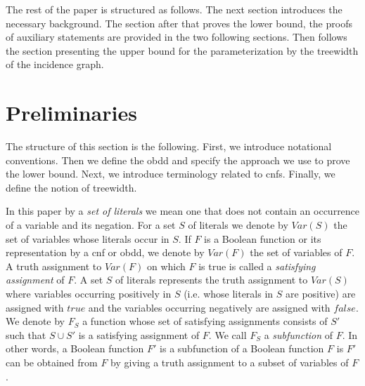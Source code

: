 \documentclass{article}
\begin{document}
\begin{comment}
To keep the representation size fixed-parameter in the treewidth size, {\sc obdd} has been upgraded
to the tree of {\sc obdd}s \cite{McMillan94,SubbaTree}. 
\end{comment}
\begin{comment}
In addition to the $O(n^k)$ upper bound mentioned above, \cite{VardiTWD} also considers the case where some variables of the given 
{\sc cnf} are existentially quantified and proves a lower bound of $2^{f(p)}n$ where $f(p)$ is an exponential function. 
This result shows that the
operation of projection (variable elimination) causes exponential blow-up in the {\sc obdd} size. 
It is interesting to note that for a more general class {\sc dnnf} the projection operation effectively
does not increase the representation size at all \cite{DarwicheJACM}. In other words, if we consider an {\sc obdd}
as a {\sc dnnf} \cite{DerMar} and apply the projection operation as specified in \cite{DarwicheJACM}, the 
resulting representation will not necessarily be an {\sc obdd}.
\end{comment}

The rest of the paper is structured as follows.
The next section introduces the necessary background. 
The section after that proves the lower bound, the proofs of auxiliary statements 
are provided in the two following sections. 
Then follows the section presenting the
upper bound for the parameterization
by the treewidth of the incidence graph. 



\section{Preliminaries} \label{prelim}
The structure of this section is the following. First, we introduce
notational conventions. Then we define the {\sc obdd} and specify the approach
we use to prove the lower bound. Next, we introduce terminology related
to {\sc cnf}s. Finally, we define the notion of treewidth.

In this paper by a \emph{set of literals} we mean one that does not
contain an occurrence of a variable and its negation.
For a set $S$ of literals we denote by $Var(S)$ the set of variables
whose literals occur in $S$. If $F$ is a Boolean function
or its representation by a {\sc cnf} or {\sc obdd}, we denote by $Var(F)$
the set of variables of $F$. A truth assignment to $Var(F)$ on which $F$
is true is called a \emph{satisfying assignment} of $F$. A set $S$ of literals
represents the truth assignment to $Var(S)$ where variables occurring
positively in $S$ (i.e. whose literals in $S$ are positive) are assigned with $true$
and the variables occurring negatively are assigned with $false$.
We denote by $F_S$ a function whose set of satisfying assignments consists of $S'$
such that $S \cup S'$ is a satisfying assignment of $F$. We call $F_S$ a \emph{subfunction}
of $F$. In other words, a Boolean function $F'$ is a subfunction of a Boolean function
$F$ is $F'$ can be obtained from $F$ by giving a truth assignment to a subset of variables of $F$.
\end{document}
